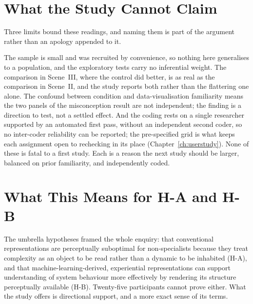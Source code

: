 \section{What the Study Cannot Claim}
\label{sec:disc-limits}

Three limits bound these readings, and naming them is part of the argument rather than an apology appended to it.

The sample is small and was recruited by convenience, so nothing here generalises to a population, and the exploratory tests carry no inferential weight. The comparison in Scene~III, where the control did better, is as real as the comparison in Scene~II, and the study reports both rather than the flattering one alone. The confound between condition and data-visualisation familiarity means the two panels of the misconception result are not independent; the finding is a direction to test, not a settled effect. And the coding rests on a single researcher supported by an automated first pass, without an independent second coder, so no inter-coder reliability can be reported; the pre-specified grid is what keeps each assignment open to rechecking in its place (Chapter~\ref{ch:userstudy}). None of these is fatal to a first study. Each is a reason the next study should be larger, balanced on prior familiarity, and independently coded.

\section{What This Means for H-A and H-B}
\label{sec:disc-umbrella}

The umbrella hypotheses framed the whole enquiry: that conventional representations are perceptually suboptimal for non-specialists because they treat complexity as an object to be read rather than a dynamic to be inhabited (H-A), and that machine-learning-derived, experiential representations can support understanding of system behaviour more effectively by rendering its structure perceptually available (H-B). Twenty-five participants cannot prove either. What the study offers is directional support, and a more exact sense of its terms.

